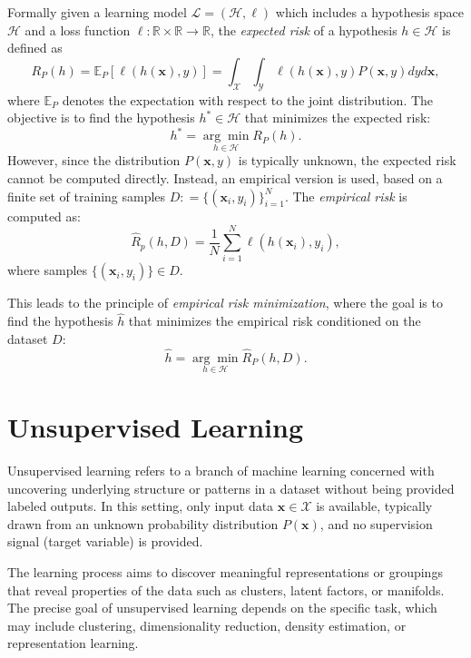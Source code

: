 Formally given a learning model $\mathcal{L} = (\mathcal{H},\ell)$ which
includes a hypothesis space $\mathcal{H}$ and a loss function $\ell: \mathbb{R}
    \times \mathbb{R} \rightarrow \mathbb{R}$, the \emph{expected risk} of a
hypothesis $h \in \mathcal{H}$ is defined as
\begin{equation}
    R_P(h) = \mathbb{E}_P[\ell(h(\mathbf{x}),y)] = \int_{\mathcal{X}} \int_{\mathcal{Y}}
    \ell(h(\mathbf{x}),y)P(\mathbf{x},y)dyd\mathbf{x},
\end{equation}
where $\mathbb{E}_P$ denotes the expectation with respect to the joint distribution.
The objective is to find the hypothesis $h^* \in \mathcal{H}$ that minimizes
the expected risk:
\begin{equation}
    h^* = \underset{h \in \mathcal{H}}{\arg\min} R_P(h).
\end{equation}
However, since the distribution $P(\mathbf{x},y)$ is typically unknown, the
expected risk cannot be computed directly. Instead, an empirical version is
used, based on a finite set of training samples $D: = \{  (\mathbf{x}_i, y_i)  \}_{i=1}^N$.
The \emph{empirical risk} is computed as:
\begin{equation}
    \hat{R}_p(h, D) = {\frac{1}{N}} \sum^N_{i=1} \ell(h(\mathbf{x}_i),y_i),
\end{equation}
where samples $\{ (\mathbf{x}_i, y_i) \} \in D$.

This leads to the principle of \emph{empirical risk minimization}, where the
goal is to find the hypothesis $\hat{h}$ that minimizes the empirical risk
conditioned on the dataset $D$:
\begin{equation}
    \hat{h} = \underset{h \in \mathcal{H}}{\arg\min} \hat{R}_P(h, D).
\end{equation}

\section{Unsupervised Learning}\label{sec:unsupervised_learning}
Unsupervised learning refers to a branch of machine learning concerned with
uncovering underlying structure or patterns in a dataset without being provided
labeled outputs. In this setting, only input data $\mathbf{x} \in \mathcal{X}$
is available, typically drawn from an unknown probability distribution
$P(\mathbf{x})$, and no supervision signal (target variable) is provided.

The learning process aims to discover meaningful representations or groupings
that reveal properties of the data such as clusters, latent factors, or
manifolds. The precise goal of unsupervised learning depends on the specific
task, which may include clustering, dimensionality reduction, density
estimation, or representation learning.

